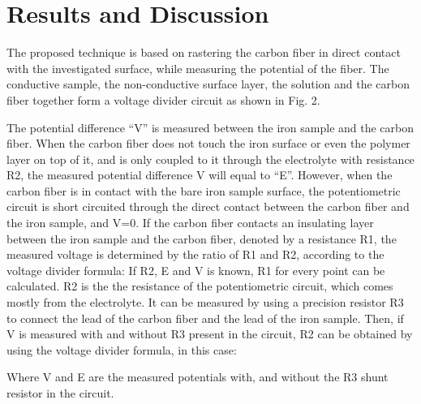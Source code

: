 \documentclass[3p]{elsarticle}
\begin{document}
\section{Results and Discussion}
The proposed technique is based on rastering the carbon fiber in direct contact with the investigated surface, while measuring the potential of the fiber. The conductive sample, the non-conductive surface layer, the solution and the carbon fiber together form a voltage divider circuit as shown in Fig. 2.

The potential difference “V” is measured between the iron sample and the carbon fiber. When the carbon fiber does not touch the iron surface or even the polymer layer on top of it, and is only coupled to it through the electrolyte with resistance R2, the measured potential difference V will equal to “E”. However, when the carbon fiber is in contact with the bare iron sample surface, the potentiometric circuit is short circuited through the direct contact between the carbon fiber and the iron sample, and V=0. If the carbon fiber contacts an insulating layer between the iron sample and the carbon fiber, denoted by a resistance R1, the measured voltage is determined by the ratio of R1 and R2, according to the voltage divider formula:
If R2, E and V is known, R1 for every point can be calculated. R2 is the the resistance of the potentiometric circuit, which comes mostly from the electrolyte. It can be measured by using a precision resistor R3 to connect the lead of the carbon fiber and the lead of the iron sample. Then, if V is measured with and without R3 present in the circuit, R2 can be obtained by using the voltage divider formula, in this case:

Where V and E are the measured potentials with, and without the R3 shunt resistor in the circuit.
\end{document}
